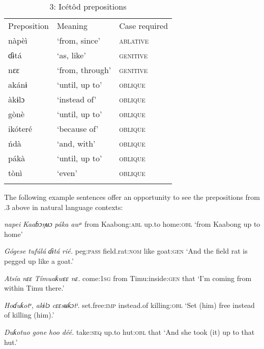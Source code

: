 \begin{table}
\caption{3: Icétôd prepositions}
\label{tab:3}


\begin{tabularx}{\textwidth}{XXX}
\lsptoprule

Preposition & Meaning & Case required\\
nàpèì & ‘from, since’ & \textsc{ablative}\\
ɗɨtá & ‘as, like’ & \textsc{genitive}\\
nɛɛ & ‘from, through’ & \textsc{genitive}\\
akánɨ & ‘until, up to’ & \textsc{oblique}\\
àkɨlɔ & ‘instead of’ & \textsc{oblique}\\
gònè & ‘until, up to’ & \textsc{oblique}\\
ikóteré & ‘because of’ & \textsc{oblique}\\
ńdà & ‘and, with’ & \textsc{oblique}\\
pákà & ‘until, up to’ & \textsc{oblique}\\
tònì & ‘even’ & \textsc{oblique}\\
\lspbottomrule
\end{tabularx}
\end{table}
The following example sentences offer an opportunity to see the prepositions from .3 above in natural language contexts:


 
\textit{napei}\textit{ Kaaɓɔŋʉɔ}     \textit{páka}\textit{   awᵃ} 
from   Kaabong:\textsc{abl}   up.to   home:\textsc{obl} 
‘from Kaabong up to home’

\textit{Gógese   tufúlá}       \textit{ɗɨtá}\textit{   rié.}
peg:\textsc{pass}   field.rat:\textsc{nom}   like   goat:\textsc{gen}
‘And the field rat is pegged up like a goat.’





\textit{Atsía}     \textit{nɛɛ}\textit{   Tímuaƙwɛɛ     nɛ.}
come:\textsc{1sg}   from   Timu:inside:\textsc{gen}   that
‘I’m coming from within Timu there.’




\textit{Hoɗuƙotᵉ,}   \textit{akɨlɔ}\textit{     cɛɛsʉƙɔtᶤ.}
set.free:\textsc{imp}   instead.of   killing:\textsc{obl}
‘Set (him) free instead of killing (him).’




\textit{Duƙotuo}   \textit{gone}\textit{   hoo     déé.}
take:\textsc{seq}   up.to   hut:\textsc{obl}   that
‘And she took (it) up to that hut.’




